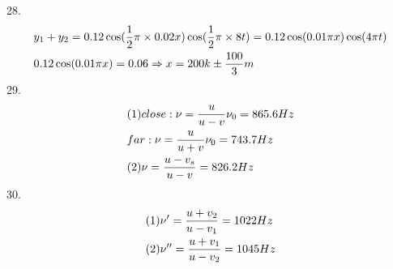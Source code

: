 \documentclass{article}
\begin{document}
28.\[\begin{gathered}
{y_1} + {y_2} = 0.12\cos (\frac{1}{2}\pi  \times 0.02x)\cos (\frac{1}{2}\pi  \times 8t) = 0.12\cos (0.01\pi x)\cos (4\pi t) \hfill \\
0.12\cos (0.01\pi x) = 0.06 \Rightarrow x = 200k \pm \frac{{100}}{3} m \hfill \\ 
\end{gathered} \]
29.\[\begin{gathered}
(1)close:\nu  = \frac{u}{{u - v}}{\nu _0} = 865.6Hz \hfill \\
far:\nu  = \frac{u}{{u + v}}{\nu _0} = 743.7Hz \hfill \\
(2)\nu  = \frac{{u - {v_s}}}{{u - v}} = 826.2Hz \hfill \\ 
\end{gathered} \]
30.\[\begin{gathered}
(1)\nu ' = \frac{{u + {v_2}}}{{u - {v_1}}} = 1022Hz \hfill \\
(2)\nu '' = \frac{{u + {v_1}}}{{u - {v_2}}} = 1045Hz \hfill \\ 
\end{gathered} \]
\end{document}
